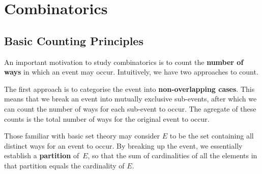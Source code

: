 \documentclass[math]{amznotes}
\theoremstyle{remark}
\newcommand{\0}{\mathbf{0}}
\newcommand{\1}{\mathbf{1}}
\begin{document}
\tableofcontents

\chapter{Combinatorics}
\section{Basic Counting Principles}
An important motivation to study combinatorics is to count the \textbf{number of ways} in which an event may occur. Intuitively, we have two approaches to count.

The first approach is to categorise the event into \textbf{non-overlapping cases}. This means that we break an event into mutually exclusive sub-events, after which we can count the number of ways for each sub-event to occur. The agregate of these counts is the total number of ways for the original event to occur.

Those familiar with basic set theory may consider $E$ to be the set containing all distinct ways for an event to occur. By breaking up the event, we essentially establish a \textbf{partition} of~$E$, so that the sum of cardinalities of all the elements in that partition equals the cardinality of $E$.
\end{document}
